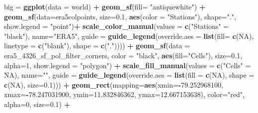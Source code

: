 \documentclass[12pt,twoside]{reedthesis}
\newenvironment{Shaded}{\begin{snugshade}}{\end{snugshade}}
\newcommand{\DataTypeTok}[1]{\textcolor[rgb]{0.13,0.29,0.53}{#1}}
\newcommand{\DecValTok}[1]{\textcolor[rgb]{0.00,0.00,0.81}{#1}}
\newcommand{\FloatTok}[1]{\textcolor[rgb]{0.00,0.00,0.81}{#1}}
\newcommand{\KeywordTok}[1]{\textcolor[rgb]{0.13,0.29,0.53}{\textbf{#1}}}
\newcommand{\NormalTok}[1]{#1}
\newcommand{\OperatorTok}[1]{\textcolor[rgb]{0.81,0.36,0.00}{\textbf{#1}}}
\newcommand{\OtherTok}[1]{\textcolor[rgb]{0.56,0.35,0.01}{#1}}
\newcommand{\StringTok}[1]{\textcolor[rgb]{0.31,0.60,0.02}{#1}}
\begin{document}
\begin{Shaded}
\begin{Highlighting}[]
\NormalTok{big =}\StringTok{ }\KeywordTok{ggplot}\NormalTok{(}\DataTypeTok{data =}\NormalTok{ world) }\OperatorTok{+}\StringTok{ }
\StringTok{  }\KeywordTok{geom_sf}\NormalTok{(}\DataTypeTok{fill=} \StringTok{"antiquewhite"}\NormalTok{) }\OperatorTok{+}
\StringTok{  }\KeywordTok{geom_sf}\NormalTok{(}\DataTypeTok{data=}\NormalTok{era5colpoints, }\DataTypeTok{size=}\FloatTok{0.1}\NormalTok{, }\KeywordTok{aes}\NormalTok{(}\DataTypeTok{color =} \StringTok{"Stations"}\NormalTok{), }\DataTypeTok{shape=}\StringTok{"."}\NormalTok{,  }\DataTypeTok{show.legend =} \StringTok{"point"}\NormalTok{)}\OperatorTok{+}
\StringTok{  }\KeywordTok{scale_color_manual}\NormalTok{(}\DataTypeTok{values =} \KeywordTok{c}\NormalTok{(}\StringTok{"Stations"}\NormalTok{ =}\StringTok{ "black"}\NormalTok{), }\DataTypeTok{name=}\StringTok{"ERA5"}\NormalTok{, }\DataTypeTok{guide =} \KeywordTok{guide_legend}\NormalTok{(}\DataTypeTok{override.aes =} \KeywordTok{list}\NormalTok{(}\DataTypeTok{fill=} \KeywordTok{c}\NormalTok{(}\OtherTok{NA}\NormalTok{), }\DataTypeTok{linetype =} \KeywordTok{c}\NormalTok{(}\StringTok{"blank"}\NormalTok{), }
   \DataTypeTok{shape =} \KeywordTok{c}\NormalTok{(}\StringTok{"."}\NormalTok{)))) }\OperatorTok{+}
\StringTok{  }\KeywordTok{geom_sf}\NormalTok{(}\DataTypeTok{data =}\NormalTok{ era5_}\DecValTok{4326}\NormalTok{_sf_pol_filter_corners, }\DataTypeTok{color =} \StringTok{"black"}\NormalTok{, }\KeywordTok{aes}\NormalTok{(}\DataTypeTok{fill=}\StringTok{"Cells"}\NormalTok{), }\DataTypeTok{size=}\FloatTok{0.1}\NormalTok{, }\DataTypeTok{alpha=}\DecValTok{1}\NormalTok{, }\DataTypeTok{show.legend =} \StringTok{"polygon"}\NormalTok{) }\OperatorTok{+}
\StringTok{  }\KeywordTok{scale_fill_manual}\NormalTok{(}\DataTypeTok{values =} \KeywordTok{c}\NormalTok{(}\StringTok{"Cells"}\NormalTok{ =}\StringTok{ }\OtherTok{NA}\NormalTok{), }\DataTypeTok{name=}\StringTok{""}\NormalTok{, }\DataTypeTok{guide =} \KeywordTok{guide_legend}\NormalTok{(}\DataTypeTok{override.aes =} \KeywordTok{list}\NormalTok{(}\DataTypeTok{fill =} \KeywordTok{c}\NormalTok{(}\OtherTok{NA}\NormalTok{), }\DataTypeTok{shape =} \KeywordTok{c}\NormalTok{(}\OtherTok{NA}\NormalTok{), }\DataTypeTok{size=}\FloatTok{0.1}\NormalTok{))) }\OperatorTok{+}
\StringTok{  }\KeywordTok{geom_rect}\NormalTok{(}\DataTypeTok{mapping=}\KeywordTok{aes}\NormalTok{(}\DataTypeTok{xmin=}\OperatorTok{-}\FloatTok{79.252968100}\NormalTok{, }\DataTypeTok{xmax=}\OperatorTok{-}\FloatTok{78.247031900}\NormalTok{, }\DataTypeTok{ymin=}\FloatTok{11.832846362}\NormalTok{, }\DataTypeTok{ymax=}\FloatTok{12.667153638}\NormalTok{), }\DataTypeTok{color=}\StringTok{"red"}\NormalTok{, }\DataTypeTok{alpha=}\DecValTok{0}\NormalTok{, }\DataTypeTok{size=}\FloatTok{0.1}\NormalTok{) }\OperatorTok{+}

\end{Highlighting}
\end{Shaded}
\end{document}
